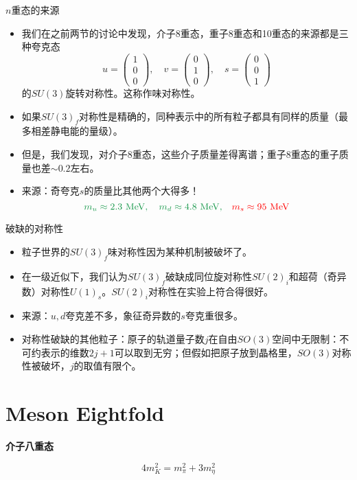 \documentclass[aspectratio=1610,14pt,mathserif]{beamer}
\newcommand{\bch}{}
\newcommand{\ech}{}
\def\bcenter{\begin{center}}
\def\ecenter{\end{center}}
\def\skipline{{\vskip0.1in}}
\def\tbox#1{\begin{tcolorbox}#1\end{tcolorbox}}
\def\secpage#1#2{\begin{frame}\bch\bcenter{\bf \Huge #1} \skipline \tbox{#2}\ecenter\ech\end{frame}}
\newcommand{\mat}[1]{\begin{pmatrix}#1\end{pmatrix}}
\newcommand{\mev}{\ {\rm MeV}}
\newcommand{\red}[1]{{\color{red} #1}}
\def\green#1{{\color[rgb]{0.1,0.6,0.3}#1}}
\begin{document}
\begin{frame}{$n$重态的来源}
\begin{itemize}
\item
我们在之前两节的讨论中发现，介子8重态，重子8重态和10重态的来源都是三种夸克态
$$
u = \mat{1\\0 \\0},\quad v = \mat{0\\1\\0},\quad s = \mat{0\\0\\1}
$$
的$SU(3)$旋转对称性。这称作味对称性。
\item
如果$SU(3)_f$对称性是精确的，同种表示中的所有粒子都具有同样的质量（最多相差静电能的量级）。
\item
但是，我们发现，对介子8重态，这些介子质量差得离谱；重子8重态的重子质量也差$\sim 0.2$左右。
\item
来源：奇夸克$s$的质量比其他两个大得多！
$$
\green{m_u \approx 2.3\mev,\quad m_d \approx 4.8\mev,}\quad \red{m_s \approx 95\mev}
$$
\end{itemize}
\end{frame}

\begin{frame}{破缺的对称性}
\begin{itemize}
\item
粒子世界的$SU(3)_f$味对称性因为某种机制被破坏了。
\item
在一级近似下，我们认为$SU(3)_f$破缺成同位旋对称性$SU(2)_i$和超荷（奇异数）对称性$U(1)_s$。$SU(2)_i$对称性在实验上符合得很好。
\item
来源：$u,d$夸克差不多，象征奇异数的$s$夸克重很多。
\item
对称性破缺的其他粒子：原子的轨道量子数$j$在自由$SO(3)$空间中无限制：不可约表示的维数$2j+1$可以取到无穷；但假如把原子放到晶格里，$SO(3)$对称性被破坏，$j$的取值有限个。
\end{itemize}
\end{frame}




\section{Meson Eightfold}
\secpage{介子八重态}{$$4m_K^2=m_\pi^2 + 3m_\eta^2$$}
\end{document}
